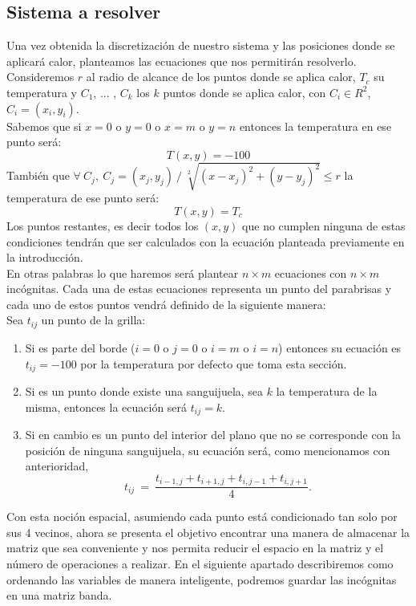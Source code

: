 \subsection{Sistema a resolver}

Una vez obtenida la discretización de nuestro sistema y las posiciones donde se aplicará calor, planteamos las ecuaciones que nos permitirán resolverlo. Consideremos $r$ al radio de alcance de los puntos donde se aplica calor, $T_c$ su temperatura y $C_1$, ... , $C_k$ los $k$ puntos donde se aplica calor, con $C_i \in R^2$, $C_i = (x_i, y_i)$.
\\
Sabemos que si $ x = 0$ o $y = 0$ o $x = m$ o $y = n$ entonces la temperatura en ese punto será:
$$T(x,y) = -100$$
También que $\forall \: C_j, \: C_j = (x_j, y_j) \: / \: \sqrt[2]{(x-x_j)^2 + (y-y_j)^2} \le r$ la temperatura de ese punto será:
$$T(x,y) = T_c$$ 
Los puntos restantes, es decir todos los $(x,y)$ que no cumplen ninguna de estas condiciones tendrán que ser calculados con la ecuación planteada previamente en la introducción.
\\
En otras palabras lo que haremos será plantear $n \times m$ ecuaciones con $n \times m$ incógnitas. Cada una de estas ecuaciones representa un punto del parabrisas y cada uno de estos puntos vendrá definido de la siguiente manera:
\\
Sea $t_{ij}$ un punto de la grilla:
\begin{enumerate}
 \item Si es parte del borde ($ i = 0$ o $j = 0$ o $i = m$ o $i = n$) entonces su ecuación es $t_{ij} = -100$ por la temperatura por defecto que toma esta sección.
 \item Si es un punto donde existe una sanguijuela, sea $k$ la temperatura de la misma, entonces la ecuación será $t_{ij} = k$.
 \item Si en cambio es un punto del interior del plano que no se corresponde con la posición de ninguna sanguijuela, su ecuación será, como mencionamos con anterioridad, 
\begin{equation}
t_{ij} \ =\ \frac{ t_{i-1,j} + t_{i+1,j} + t_{i,j-1} + t_{i,j+1}}{4}.
\end{equation}
\end{enumerate}

Con esta noción espacial, asumiendo cada punto está condicionado tan solo por sus 4 vecinos, ahora se presenta el objetivo encontrar una manera de almacenar la matriz que sea conveniente y nos permita reducir el espacio en la matriz y el número de operaciones a realizar. En el siguiente apartado describiremos como ordenando las variables de manera inteligente, podremos guardar las incógnitas en una matriz banda.

